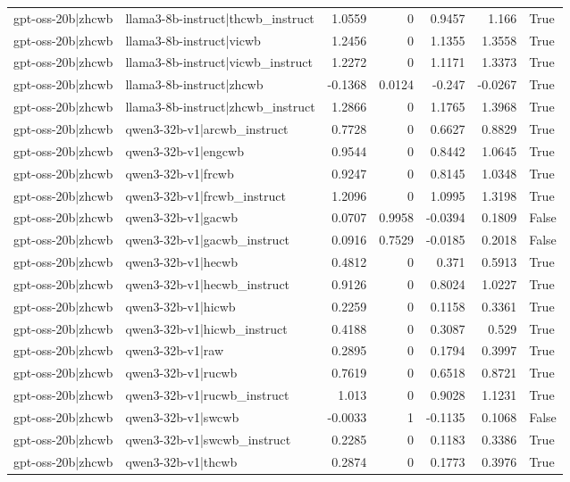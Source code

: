 \begin{table}
\begin{tabular}{l l r r r r l}
gpt-oss-20b|zhcwb & llama3-8b-instruct|thcwb_instruct & 1.0559 & 0 & 0.9457 & 1.166 & True \\
gpt-oss-20b|zhcwb & llama3-8b-instruct|vicwb & 1.2456 & 0 & 1.1355 & 1.3558 & True \\
gpt-oss-20b|zhcwb & llama3-8b-instruct|vicwb_instruct & 1.2272 & 0 & 1.1171 & 1.3373 & True \\
gpt-oss-20b|zhcwb & llama3-8b-instruct|zhcwb & -0.1368 & 0.0124 & -0.247 & -0.0267 & True \\
gpt-oss-20b|zhcwb & llama3-8b-instruct|zhcwb_instruct & 1.2866 & 0 & 1.1765 & 1.3968 & True \\
gpt-oss-20b|zhcwb & qwen3-32b-v1|arcwb_instruct & 0.7728 & 0 & 0.6627 & 0.8829 & True \\
gpt-oss-20b|zhcwb & qwen3-32b-v1|engcwb & 0.9544 & 0 & 0.8442 & 1.0645 & True \\
gpt-oss-20b|zhcwb & qwen3-32b-v1|frcwb & 0.9247 & 0 & 0.8145 & 1.0348 & True \\
gpt-oss-20b|zhcwb & qwen3-32b-v1|frcwb_instruct & 1.2096 & 0 & 1.0995 & 1.3198 & True \\
gpt-oss-20b|zhcwb & qwen3-32b-v1|gacwb & 0.0707 & 0.9958 & -0.0394 & 0.1809 & False \\
gpt-oss-20b|zhcwb & qwen3-32b-v1|gacwb_instruct & 0.0916 & 0.7529 & -0.0185 & 0.2018 & False \\
gpt-oss-20b|zhcwb & qwen3-32b-v1|hecwb & 0.4812 & 0 & 0.371 & 0.5913 & True \\
gpt-oss-20b|zhcwb & qwen3-32b-v1|hecwb_instruct & 0.9126 & 0 & 0.8024 & 1.0227 & True \\
gpt-oss-20b|zhcwb & qwen3-32b-v1|hicwb & 0.2259 & 0 & 0.1158 & 0.3361 & True \\
gpt-oss-20b|zhcwb & qwen3-32b-v1|hicwb_instruct & 0.4188 & 0 & 0.3087 & 0.529 & True \\
gpt-oss-20b|zhcwb & qwen3-32b-v1|raw & 0.2895 & 0 & 0.1794 & 0.3997 & True \\
gpt-oss-20b|zhcwb & qwen3-32b-v1|rucwb & 0.7619 & 0 & 0.6518 & 0.8721 & True \\
gpt-oss-20b|zhcwb & qwen3-32b-v1|rucwb_instruct & 1.013 & 0 & 0.9028 & 1.1231 & True \\
gpt-oss-20b|zhcwb & qwen3-32b-v1|swcwb & -0.0033 & 1 & -0.1135 & 0.1068 & False \\
gpt-oss-20b|zhcwb & qwen3-32b-v1|swcwb_instruct & 0.2285 & 0 & 0.1183 & 0.3386 & True \\
gpt-oss-20b|zhcwb & qwen3-32b-v1|thcwb & 0.2874 & 0 & 0.1773 & 0.3976 & True \\

\end{tabular}
\end{table}
